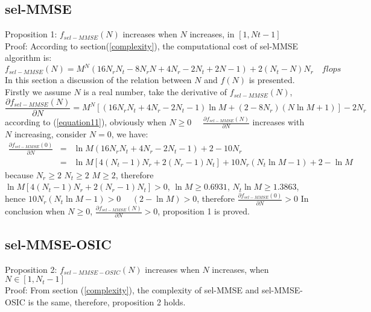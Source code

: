 \documentclass[12pt,a4paper,final]{article}
\begin{document}
\begin{spacing}{2.5}
\subsection{sel-MMSE}
Proposition 1: $f_{sel-MMSE}(N)$ increases when $N$ increases, in $[1,Nt-1]$\\
Proof: According to section(\ref{complexity}), the computational cost of sel-MMSE algorithm is:
\begin{equation}
f_{sel-MMSE}(N)=M^{N}(16N_{r}N_{t}-8N_{r}N+4N_{r}-2N_{t}+2N-1)+2(N_{t}-N)N_{r}\quad flops
\end{equation}
In this section a discussion of the relation between $N$ and $f(N)$ is presented. Firstly we assume $N$ is a real number, take the derivative of $f_{sel-MMSE}(N)$,
\begin{equation}
\frac{\partial f_{sel-MMSE}(N)}{\partial N}=M^{N}[(16N_{r}N_{t}+4N_{r}-2N_{t}-1)\ln{M}+(2-8N_{r})(N\ln{M}+1)]-2N_{r}\label{equation11}
\end{equation}
according to (\ref{equation11}), obviously when $N\geq 0\quad$  $\frac{\partial f_{sel-MMSE}(N)}{\partial N}$ increases with $N$ increasing, consider $N=0$, we have:
\begin{eqnarray}
\nonumber
\frac{\partial f_{sel-MMSE}(0)}{\partial N}&=&\ln{M}(16N_{r}N_{t}+4N_{r}-2N_{t}-1)+2-10N_{r}\\
\nonumber
&=&\ln{M}[4(N_{t}-1)N_{r}+2(N_{r}-1)N_{t}]+10N_{r}(N_{t}\ln{M}-1)+2-\ln{M}  \label{equation51}
\end{eqnarray}
because $N_{r}\geq 2$ $N_{t}\geq 2$ $M\geq 2$, therefore $\ln{M}[4(N_{t}-1)N_{r}+2(N_{r}-1)N_{t}]>0$, $\ln{M}\geq 0.6931$, $N_{t}\ln{M}\geq 1.3863$, hence $10N_{r}(N_{t}\ln{M}-1)>0\quad$ $(2-\ln{M})>0$, therefore $\frac{\partial f_{sel-MMSE}(0)}{\partial N}>0$ In conclusion when $N\geq 0$, $\frac{\partial f_{sel-MMSE}(N)}{\partial N}>0$, proposition 1 is proved.
\subsection{sel-MMSE-OSIC}
Proposition 2: $f_{sel-MMSE-OSIC}(N)$ increases when $N$ increases, when $N\in [1, N_{t}-1]$\\
Proof: From section (\ref{complexity}), the complexity of sel-MMSE and sel-MMSE-OSIC is the same, therefore, proposition 2 holds.


\end{spacing}
\end{document}
